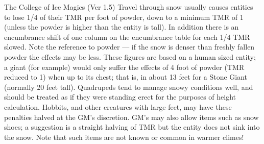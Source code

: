 \begin{Chapter}{The College of Ice Magics (Ver 1.5)}
Travel through snow usually causes entities to lose 1/4 of their TMR
per foot of powder, down to a minimum TMR of 1 (unless the powder is
higher than the entity is tall).  In addition there is an encumbrance
shift of one column on the encumbrance table for each 1/4 TMR slowed.
Note the reference to powder — if the snow is denser than freshly
fallen powder the effects may be less.  These figures are based on a
human sized entity; a giant (for example) would only suffer the
effects of 4 foot of powder (TMR reduced to 1) when up to its chest;
that is, in about 13 feet for a Stone Giant (normally 20 feet
tall). Quadrupeds tend to manage snowy conditions well, and should be
treated as if they were standing erect for the purposes of height
calculation. Hobbits, and other creatures with large feet, may have
these penalties halved at the GM’s discretion.  GM’s may also allow
items such as snow shoes; a suggestion is a straight halving of TMR
but the entity does not sink into the snow.  Note that such items are
not known or common in warmer climes!

\end{Chapter}
